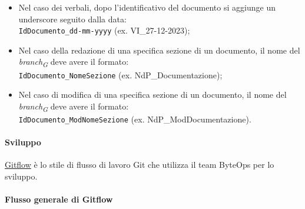 \begin{itemize}
    \item Nel caso dei verbali, dopo l'identificativo del documento si aggiunge un underscore seguito dalla data: \\
    \texttt{IdDocumento\_dd-mm-yyyy} (ex. VI\_27-12-2023);
    \item Nel caso della redazione di una specifica sezione di un documento, il nome del \textit{branch}\textsubscript{\textit{G}} deve avere il formato: \\
    \texttt{IdDocumento\_NomeSezione} (ex. NdP\_Documentazione);
    \item Nel caso di modifica di una specifica sezione di un documento, il nome del \textit{branch}\textsubscript{\textit{G}} deve avere il formato: \\
    \texttt{IdDocumento\_ModNomeSezione} (ex. NdP\_ModDocumentazione).
\end{itemize}

\paragraph{Sviluppo}
\href{https://www.atlassian.com/it/git/tutorials/comparing-workflows/gitflow-workflow}{Gitflow} è lo stile di flusso di lavoro Git che utilizza il team ByteOps per lo sviluppo.

\paragraph*{Flusso generale di Gitflow}

